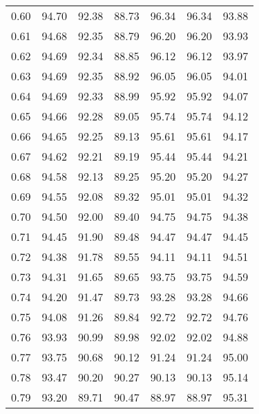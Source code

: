 \begin{tabular}{|c|c|c|c|c|c|c|}
      0.60 &     94.70 &     92.38 &      88.73 &   96.34 &      96.34 &         93.88 \\
      0.61 &     94.68 &     92.35 &      88.79 &   96.20 &      96.20 &         93.93 \\
      0.62 &     94.69 &     92.34 &      88.85 &   96.12 &      96.12 &         93.97 \\
      0.63 &     94.69 &     92.35 &      88.92 &   96.05 &      96.05 &         94.01 \\
      0.64 &     94.69 &     92.33 &      88.99 &   95.92 &      95.92 &         94.07 \\
      0.65 &     94.66 &     92.28 &      89.05 &   95.74 &      95.74 &         94.12 \\
      0.66 &     94.65 &     92.25 &      89.13 &   95.61 &      95.61 &         94.17 \\
      0.67 &     94.62 &     92.21 &      89.19 &   95.44 &      95.44 &         94.21 \\
      0.68 &     94.58 &     92.13 &      89.25 &   95.20 &      95.20 &         94.27 \\
      0.69 &     94.55 &     92.08 &      89.32 &   95.01 &      95.01 &         94.32 \\
      0.70 &     94.50 &     92.00 &      89.40 &   94.75 &      94.75 &         94.38 \\
      0.71 &     94.45 &     91.90 &      89.48 &   94.47 &      94.47 &         94.45 \\
      0.72 &     94.38 &     91.78 &      89.55 &   94.11 &      94.11 &         94.51 \\
      0.73 &     94.31 &     91.65 &      89.65 &   93.75 &      93.75 &         94.59 \\
      0.74 &     94.20 &     91.47 &      89.73 &   93.28 &      93.28 &         94.66 \\
      0.75 &     94.08 &     91.26 &      89.84 &   92.72 &      92.72 &         94.76 \\
      0.76 &     93.93 &     90.99 &      89.98 &   92.02 &      92.02 &         94.88 \\
      0.77 &     93.75 &     90.68 &      90.12 &   91.24 &      91.24 &         95.00 \\
      0.78 &     93.47 &     90.20 &      90.27 &   90.13 &      90.13 &         95.14 \\
      0.79 &     93.20 &     89.71 &      90.47 &   88.97 &      88.97 &         95.31 \\

\end{tabular}
